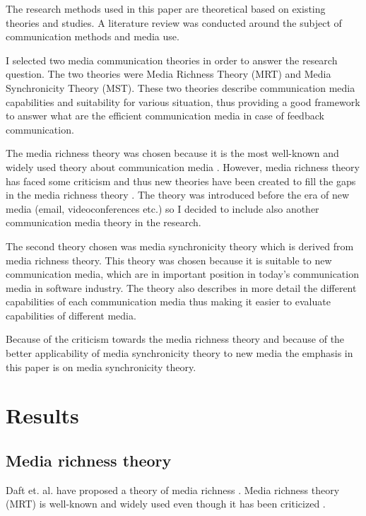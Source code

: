 \documentclass[conference]{IEEEtran}
\begin{document}
The research methods used in this paper are theoretical based on existing theories and studies. A literature review was conducted around the subject of communication methods and media use.

I selected two media communication theories in order to answer the research question. The two theories were Media Richness Theory (MRT) and Media Synchronicity Theory (MST). These two theories describe communication media capabilities and suitability for various situation, thus providing a good framework to answer what are the efficient communication media in case of feedback communication.

The media richness theory was chosen because it is the most well-known and widely used theory about communication media \cite{1986daft}\cite{2006korkala}. However, media richness theory has faced some criticism and thus new theories have been created to fill the gaps in the media richness theory \cite{1999dennis}. The theory was introduced before the era of new media (email, videoconferences etc.) so I decided to include also another communication media theory in the research.

The second theory chosen was media synchronicity theory which is derived from media richness theory. This theory was chosen because it is suitable to new communication media, which are in important position in today's communication media in software industry. The theory also describes in more detail the different capabilities of each communication media thus making it easier to evaluate capabilities of different media.

Because of the criticism towards the media richness theory and because of the better applicability of media synchronicity theory to new media the emphasis in this paper is on media synchronicity theory.

\section{Results}

\subsection{Media richness theory}

Daft et. al. have proposed a theory of media richness \cite{1986daft}. Media richness theory (MRT) is well-known and widely used even though it has been criticized \cite{2006korkala} \cite{1999dennis}. 
\end{document}
